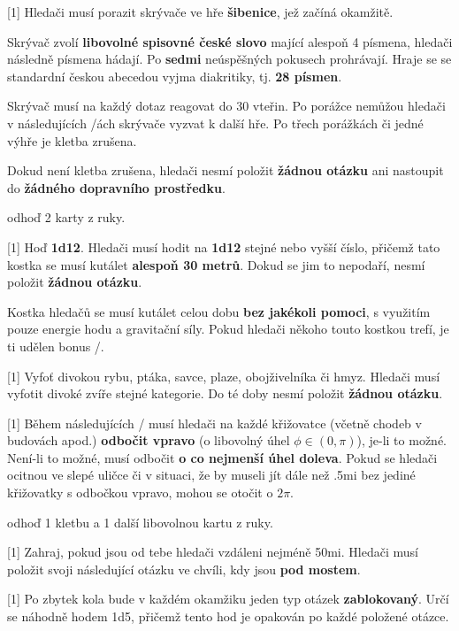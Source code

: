 \begin{cards}
	 Hledači musí porazit skrývače ve hře \textbf{šibenice}, jež začíná okamžitě.
	
	Skrývač zvolí \textbf{libovolné spisovné české slovo} mající alespoň 4 písmena, hledači následně písmena hádají. Po \textbf{sedmi} neúspěšných pokusech prohrávají. Hraje se se standardní českou abecedou vyjma diakritiky, tj. \textbf{28 písmen}.
	
	Skrývač musí na každý dotaz reagovat do 30 vteřin. Po porážce nemůžou hledači v následujících \timecursehangmancooldown/ách skrývače vyzvat k další hře. Po třech porážkách či jedné výhře je kletba zrušena.
	
	Dokud není kletba zrušena, hledači nesmí položit \textbf{žádnou otázku} ani nastoupit do \textbf{žádného dopravního prostředku}.
	
	\cost odhoď 2 karty z ruky.
	
	 Hoď \textbf{1d12}. Hledači musí hodit na \textbf{1d12} stejné nebo vyšší číslo, přičemž tato kostka se musí kutálet \textbf{alespoň 30 metrů}. Dokud se jim to nepodaří, nesmí položit \textbf{žádnou otázku}.
	
	Kostka hledačů se musí kutálet celou dobu \textbf{bez jakékoli pomoci}, s využitím pouze energie hodu a gravitační síly. Pokud hledači někoho touto kostkou trefí, je ti udělen bonus \timecursetumblehit/.
	
	 Vyfoť divokou rybu, ptáka, savce, plaze, obojživelníka či hmyz. Hledači musí vyfotit divoké zvíře stejné kategorie. Do té doby nesmí položit \textbf{žádnou otázku}.
	
	 Během následujících \timecurseturnright/ musí hledači na každé křižovatce (včetně chodeb v budovách apod.) \textbf{odbočit vpravo} (o libovolný úhel $\phi \in (0, \pi)$), je-li to možné. Není-li to možné, musí odbočit \textbf{o co nejmenší úhel doleva}. Pokud se hledači ocitnou ve slepé uličce či v situaci, že by museli jít dále než \dist.5mi bez jediné křižovatky s odbočkou vpravo, mohou se otočit o $2\pi$.
	
	\cost odhoď 1 kletbu a 1 další libovolnou kartu z ruky.
	
	 Zahraj, pokud jsou od tebe hledači vzdáleni nejméně \dist50mi. Hledači musí položit svoji následující otázku ve chvíli, kdy jsou \textbf{pod mostem}.
	
	 Po zbytek kola bude v každém okamžiku jeden typ otázek \textbf{zablokovaný}. Určí se náhodně hodem 1d5, přičemž tento hod je opakován po každé položené otázce.
	

\end{cards}
